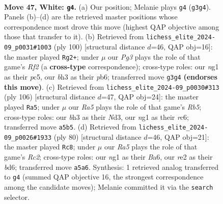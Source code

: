 \documentclass[11pt]{article}
\begin{document}
\clearpage

\begin{figure}[p]\centering
\begin{subfigure}{0.46\textwidth}\centering
\resizebox{\linewidth}{!}{%
\newchessgame
\chessboard[
  setfen={8/7p/3r1ppk/R7/1p2PK2/6Pb/4r3/6n1 w - - 0 47},
  showmover=false,
  pgfstyle=straightmove, color=movearrow, markmove={g3-g4}
]}
\caption{}
\end{subfigure}\hfill
\begin{subfigure}{0.46\textwidth}\centering
\resizebox{\linewidth}{!}{%
\newchessgame
\chessboard[
  setfen={2B5/8/1p4p1/2p3kp/P2rp3/1P6/2K2R2/8 w - - 0 51},
  showmover=false,
  pgfstyle=straightmove, color=movearrow, markmove={f2-g2}
]}
\caption{}
\end{subfigure}
\\[4pt]
\begin{subfigure}{0.46\textwidth}\centering
\resizebox{\linewidth}{!}{%
\newchessgame
\chessboard[
  setfen={8/8/2rbppkp/1R6/5P2/3N1K1P/4P3/8 w - - 21 54},
  showmover=false,
  pgfstyle=straightmove, color=movearrow, markmove={b5-a5}
]}
\caption{}
\end{subfigure}\hfill
\begin{subfigure}{0.46\textwidth}\centering
\resizebox{\linewidth}{!}{%
\newchessgame
\chessboard[
  setfen={7r/1P2k3/B2bp3/5p2/5P2/5K1p/2R5/8 w - - 2 41},
  showmover=false,
  pgfstyle=straightmove, color=movearrow, markmove={c2-c8}
]}
\caption{}
\end{subfigure}
\caption{\textbf{Move 47, White: \texttt{g4}.} (a) Our position; Melanie plays \texttt{g4} (\texttt{g3g4}). Panels (b)--(d) are the retrieved master positions whose correspondence most drove this move (highest QAP objective among those that transfer to it). (b) Retrieved from \texttt{lichess\_elite\_2024-09\_p0031\#1003} (ply 100) [structural distance $d$=46, QAP obj=16]: the master played \texttt{Rg2+}; under $\mu$ our \emph{Pg3} plays the role of that game's \emph{Rf2} (a \textbf{cross-type} correspondence); cross-type roles: our \emph{n}g1 as their \emph{p}c5, our \emph{b}h3 as their \emph{p}b6; transferred move \texttt{g3g4} \textbf{(endorses this move)}. (c) Retrieved from \texttt{lichess\_elite\_2024-09\_p0030\#313} (ply 106) [structural distance $d$=47, QAP obj=24]: the master played \texttt{Ra5}; under $\mu$ our \emph{Ra5} plays the role of that game's \emph{Rb5}; cross-type roles: our \emph{b}h3 as their \emph{N}d3, our \emph{n}g1 as their \emph{r}c6; transferred move \texttt{a5b5}. (d) Retrieved from \texttt{lichess\_elite\_2024-09\_p0026\#1933} (ply 80) [structural distance $d$=46, QAP obj=21]: the master played \texttt{Rc8}; under $\mu$ our \emph{Ra5} plays the role of that game's \emph{Rc2}; cross-type roles: our \emph{n}g1 as their \emph{B}a6, our \emph{r}e2 as their \emph{b}d6; transferred move \texttt{a5a6}. Synthesis: 1 retrieved analog transferred to \texttt{g4} (summed QAP objective 16, the strongest correspondence among the candidate moves); Melanie committed it via the \texttt{search} selector.}
\label{fig:thought-m92}
\end{figure}
\end{document}
